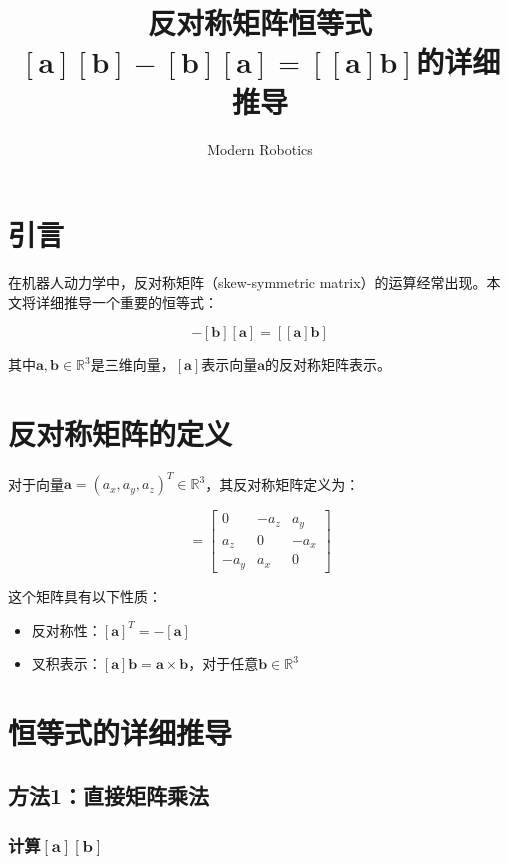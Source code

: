 \documentclass[12pt,a4paper]{article}
\title{反对称矩阵恒等式$[\bm{a}][\bm{b}] - [\bm{b}][\bm{a}] = [[\bm{a}]\bm{b}]$的详细推导}
\author{Modern Robotics}
\date{}
\begin{document}
\maketitle

\section{引言}

在机器人动力学中，反对称矩阵（skew-symmetric matrix）的运算经常出现。本文将详细推导一个重要的恒等式：

\begin{equation}
[\bm{a}][\bm{b}] - [\bm{b}][\bm{a}] = [[\bm{a}]\bm{b}]
\label{eq:main_identity}
\end{equation}

其中$\bm{a}, \bm{b} \in \mathbb{R}^3$是三维向量，$[\bm{a}]$表示向量$\bm{a}$的反对称矩阵表示。

\section{反对称矩阵的定义}

对于向量$\bm{a} = (a_x, a_y, a_z)^T \in \mathbb{R}^3$，其反对称矩阵定义为：

\begin{equation}
[\bm{a}] = \begin{bmatrix}
0 & -a_z & a_y \\
a_z & 0 & -a_x \\
-a_y & a_x & 0
\end{bmatrix}
\label{eq:skew_definition}
\end{equation}

这个矩阵具有以下性质：
\begin{itemize}
\item 反对称性：$[\bm{a}]^T = -[\bm{a}]$
\item 叉积表示：$[\bm{a}]\bm{b} = \bm{a} \times \bm{b}$，对于任意$\bm{b} \in \mathbb{R}^3$
\end{itemize}

\section{恒等式的详细推导}

\subsection{方法1：直接矩阵乘法}

\subsubsection{计算$[\bm{a}][\bm{b}]$}
\end{document}
